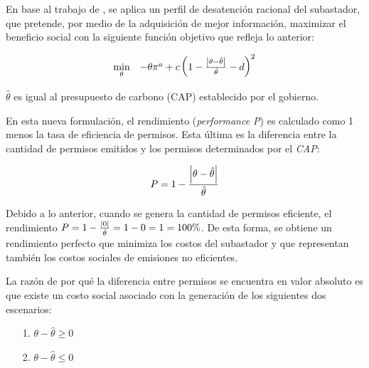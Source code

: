 En base al trabajo de , se aplica un perfil de desatención racional del subastador, que pretende, por medio de la adquisición de mejor información, maximizar el beneficio social con la siguiente función objetivo que refleja lo anterior:
\vspace{2.5mm}

\begin{equation}
\begin{array}{rrclcl}
\displaystyle \min_{\theta} & -\theta \pi^a + c\left(1-\frac{\abs{\theta - \hat{\theta}}}{\hat{\theta}}-d\right)^2 \\
\end{array}
\end{equation}
\vspace{2.5mm}

$\hat{\theta}$ es igual al presupuesto de carbono (CAP) establecido por el gobierno.
\vspace{2.5mm}

En esta nueva formulación, el rendimiento (\textit{performance P}) es calculado como 1 menos la tasa de eficiencia de permisos. Esta última es la diferencia entre la cantidad de permisos emitidos y los permisos determinados por el \textit{CAP}: 

\begin{equation}
\begin{array}{rrclcl}
\displaystyle P = 1- \frac{\abs{\theta - \hat{\theta}}}{\hat{\theta}} \\
\end{array}
\end{equation}


Debido a lo anterior, cuando se genera la cantidad de permisos eficiente, el rendimiento  $P = 1 - \frac{\abs{0}}{\hat{\theta}}= 1 - 0 = 1 =100\%$. De esta forma, se obtiene un rendimiento perfecto que minimiza los costos del subastador y que representan también los costos sociales de emisiones no eficientes.
\vspace{2.5mm}

La razón de por qué la diferencia entre permisos se encuentra en valor absoluto es que existe un costo social asociado con la generación de los siguientes dos escenarios:

\begin{enumerate}
    \item[1.] $\theta - \hat{\theta} \geq 0$
    \item[2.] $\theta - \hat{\theta} \leq 0$
\end{enumerate}

